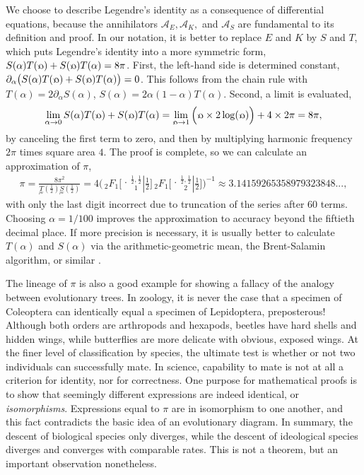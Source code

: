 \documentclass[nofootinbib,preprint]{revtex4-1}
\newcommand{\tFo}[3]{\,_2F_1 \bigg[ 
\genfrac.|{0pt}{}{#1}{#2} #3 \bigg]}
\newcommand{\rev}[1]{\text{\reflectbox{$#1$}}}
\begin{document}
We choose to describe Legendre's identity as a consequence of differential equations, 
because the annihilators $\mathcal{A}_E, \mathcal{A}_K,$ and $\mathcal{A}_S$
are fundamental to its definition and proof. In our notation, it is better to replace
$E$ and $K$ by $S$ and $T$, which puts Legendre's identity into a more symmetric 
form,  $S(\alpha)T(\rev{\alpha})+S(\rev{\alpha})T(\alpha)=8\pi$. First, the 
left-hand side is determined constant,
$\partial_{\alpha}\big(S(\alpha)T(\rev{\alpha})+S(\rev{\alpha})T(\alpha)\big)=0$.
This follows from the chain rule with $T(\alpha) = 2\partial_{\alpha}S(\alpha)$,
$S(\alpha)= 2\alpha(1-\alpha)T(\alpha)$. Second, a limit is evaluated,
\begin{eqnarray}
\lim_{\alpha \rightarrow 0} S(\alpha)T(\rev{\alpha})+S(\rev{\alpha})T(\alpha)
= \lim_{\rev{\alpha} \rightarrow 1} \Big(\rev{\alpha} \times 2 \log(\rev{\alpha}) \Big)  + 4 \times  2\pi = 8\pi,  
\nonumber
\end{eqnarray} 
by canceling the first term to zero, and then by multiplying harmonic frequency
$2\pi$ times square area $4$. The proof is complete, so we can calculate an 
approximation of $\pi$, 
\begin{eqnarray}
\pi = \frac{8\pi^2}{\underset{^{pw}}{T}(\tfrac{1}{2})\underset{^{pw}}{S}(\tfrac{1}{2})}
=4 \bigg(\tFo{\frac{1}{2},\frac{1}{2}}{1}{\frac{1}{2}} \tFo{\frac{1}{2},\frac{1}{2}}{2}{\frac{1}{2}} \bigg)^{-1}
\approx 3.14159265358979323848..., \nonumber
\end{eqnarray}
with only the last digit incorrect due to truncation of the series after $60$ terms. 
Choosing ${\alpha = 1/100}$ improves the approximation to accuracy beyond the fiftieth 
decimal place. If more precision is necessary, it is usually better to calculate $T(\alpha)$ 
and $S(\alpha)$ via the arithmetic-geometric mean, the Brent-Salamin algorithm, or similar 
\cite{AH2001}. 

The lineage of $\pi$ is also a good example for showing a fallacy of the analogy 
between evolutionary trees. In zoology, it is never the case that a specimen of Coleoptera
can identically equal a specimen of Lepidoptera, preposterous! Although both orders 
are arthropods and hexapods, beetles have hard shells and hidden wings, while butterflies 
are more delicate with obvious, exposed wings. At the finer level of classification by 
species, the ultimate test is whether or not two individuals can successfully mate. 
In science, capability to mate is not at all a criterion for identity, nor for correctness. 
One purpose for mathematical proofs is to show that seemingly different expressions are 
indeed identical, or \textit{isomorphisms}. Expressions equal to $\pi$ are in isomorphism 
to one another, and this fact contradicts the basic idea of an evolutionary diagram. 
In summary, the descent of biological species only diverges, while the descent of ideological 
species diverges and converges with comparable rates. This is not a theorem, but
an important observation nonetheless.
\end{document}
